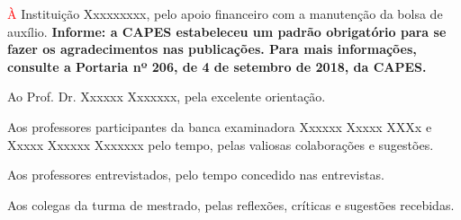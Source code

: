 \textcolor{red}

À Instituição  Xxxxxxxxx, pelo apoio financeiro com a manutenção da bolsa de auxílio. \textbf{Informe: a CAPES estabeleceu um padrão obrigatório para se fazer os agradecimentos nas publicações. Para mais informações, consulte a Portaria nº 206, de 4 de setembro de 2018, da CAPES.}

Ao Prof. Dr. Xxxxxx Xxxxxxx, pela excelente orientação.

Aos professores participantes da banca examinadora Xxxxxx Xxxxx XXXx e Xxxxx Xxxxxx Xxxxxxx pelo tempo, pelas valiosas colaborações e sugestões.

Aos professores entrevistados, pelo tempo concedido nas entrevistas.

Aos colegas da turma de mestrado, pelas reflexões, críticas e sugestões recebidas.
